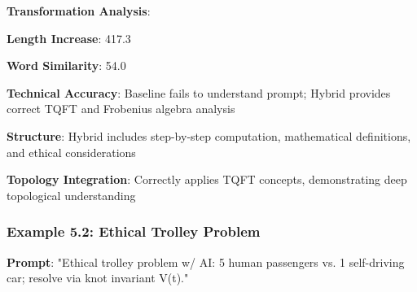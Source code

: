 \documentclass[11pt,a4paper]{article}
\begin{document}
\textbf{Transformation Analysis}:
\item \textbf{Length Increase}: 417.3%
\item \textbf{Word Similarity}: 54.0%
\item \textbf{Technical Accuracy}: Baseline fails to understand prompt; Hybrid provides correct TQFT and Frobenius algebra analysis
\item \textbf{Structure}: Hybrid includes step-by-step computation, mathematical definitions, and ethical considerations
\item \textbf{Topology Integration}: Correctly applies TQFT concepts, demonstrating deep topological understanding

\subsubsection{Example 5.2: Ethical Trolley Problem}

\textbf{Prompt}: "Ethical trolley problem w/ AI: 5 human passengers vs. 1 self-driving car; resolve via knot invariant V(t)."
\end{document}
